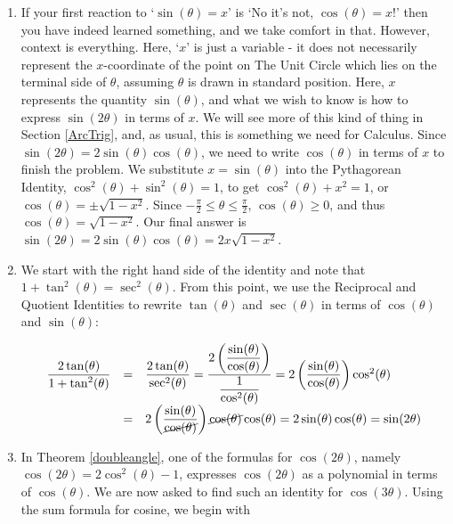 \begin{ex}
\begin{enumerate}
\item  If your first reaction to `$\sin(\theta) = x$' is `No it's not, $\cos(\theta) = x$!' then you have indeed learned something, and we take comfort in that. However, context is everything.  Here, `$x$' is just a variable - it does not necessarily represent the $x$-coordinate of the point on The Unit Circle which lies on the terminal side of $\theta$, assuming $\theta$ is drawn in standard position.  Here, $x$ represents the quantity $\sin(\theta)$, and what we wish to know is how to express $\sin(2\theta)$ in terms of $x$.  We will see more of this kind of thing in Section \ref{ArcTrig}, and, as usual, this is something we need for Calculus.  Since $\sin(2\theta) = 2 \sin(\theta) \cos(\theta)$, we need to write $\cos(\theta)$ in terms of $x$ to finish the problem.  We substitute $x = \sin(\theta)$ into the Pythagorean Identity, $\cos^{2}(\theta) + \sin^{2}(\theta) = 1$, to get $\cos^{2}(\theta) + x^2 = 1$, or $\cos(\theta) = \pm \sqrt{1-x^2}$.  Since  $-\frac{\pi}{2} \leq \theta \leq \frac{\pi}{2}$, $\cos(\theta) \geq 0$, and thus $\cos(\theta) = \sqrt{1-x^2}$.  Our final answer is  $\sin(2\theta) = 2 \sin(\theta) \cos(\theta) = 2x\sqrt{1-x^2}$.

\item  We start with the right hand side of the identity and note that $1 + \tan^{2}(\theta) = \sec^{2}(\theta)$.  From this point, we use the Reciprocal and Quotient Identities to rewrite $\tan(\theta)$ and $\sec(\theta)$ in terms of $\cos(\theta)$ and $\sin(\theta)$:

\vspace{-.15in}

\[ \begin{array}{rcl}

\dfrac{2\tan(\theta)}{1 + \tan^{2}(\theta)} & = & \dfrac{2\tan(\theta)}{\sec^{2}(\theta)}= \dfrac{2 \left( \dfrac{\sin(\theta)}{\cos(\theta)}\right)}{\dfrac{1}{\cos^{2}(\theta)}}= 2\left( \dfrac{\sin(\theta)}{\cos(\theta)}\right) \cos^{2}(\theta) \\ [15pt]
																						& = & 2\left( \dfrac{\sin(\theta)}{\cancel{\cos(\theta)}}\right) \cancel{\cos(\theta)} \cos(\theta) = 2\sin(\theta) \cos(\theta) = \sin(2\theta) \\ 

\end{array} \]

\item In Theorem \ref{doubleangle}, one of the formulas for $\cos(2\theta)$, namely $\cos(2\theta) = 2\cos^{2}(\theta) - 1$, expresses $\cos(2\theta)$ as a polynomial in terms of $\cos(\theta)$.  We are  now asked to find such an  identity for $\cos(3\theta)$.  Using the sum formula for cosine, we begin with 


\end{enumerate}
\end{ex}
